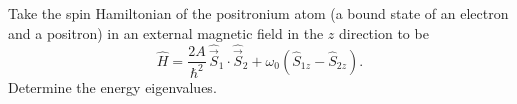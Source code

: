 \documentclass{../phys116}
\begin{document}
\begin{solution}
  \begin{problems}
  \item
  \item
  \item
  \end{problems}
\end{solution}

\begin{exercise}
  Take the spin Hamiltonian of the positronium atom (a bound state of
  an electron and a positron) in an external magnetic field in the
  \(z\) direction to be
  \[
    \hat H = \frac{2A}{\hbar^2} \, \hat{\vec S}_1 \cdot \hat{\vec S}_2
    + \omega_0 (\hat S_{1z} - \hat S_{2z}).
  \]
  Determine the energy eigenvalues.
\end{exercise}

\begin{solution}
\end{solution}
\end{document}

